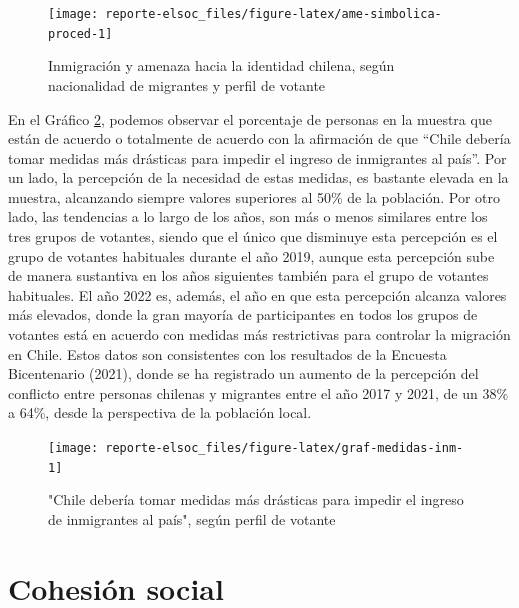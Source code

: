 \documentclass[
  12pt,
]{book}
\begin{document}
\begin{figure}

{\centering \texttt{[image: reporte-elsoc\_files/figure-latex/ame-simbolica-proced-1]} 

}

\caption{Inmigración y amenaza hacia la identidad chilena, según nacionalidad de migrantes y perfil de votante}\label{fig:ame-simbolica-proced}
\end{figure}

En el Gráfico \ref{fig:graf-medidas-inm}, podemos observar el porcentaje de personas en la muestra que están de acuerdo o totalmente de acuerdo con la afirmación de que ``Chile debería tomar medidas más drásticas para impedir el ingreso de inmigrantes al país''. Por un lado, la percepción de la necesidad de estas medidas, es bastante elevada en la muestra, alcanzando siempre valores superiores al 50\% de la población. Por otro lado, las tendencias a lo largo de los años, son más o menos similares entre los tres grupos de votantes, siendo que el único que disminuye esta percepción es el grupo de votantes habituales durante el año 2019, aunque esta percepción sube de manera sustantiva en los años siguientes también para el grupo de votantes habituales. El año 2022 es, además, el año en que esta percepción alcanza valores más elevados, donde la gran mayoría de participantes en todos los grupos de votantes está en acuerdo con medidas más restrictivas para controlar la migración en Chile. Estos datos son consistentes con los resultados de la Encuesta Bicentenario (2021), donde se ha registrado un aumento de la percepción del conflicto entre personas chilenas y migrantes entre el año 2017 y 2021, de un 38\% a 64\%, desde la perspectiva de la población local.

\begin{figure}

{\centering \texttt{[image: reporte-elsoc\_files/figure-latex/graf-medidas-inm-1]} 

}

\caption{"Chile debería tomar medidas más
drásticas para impedir el ingreso
de inmigrantes al país", según perfil de votante}\label{fig:graf-medidas-inm}
\end{figure}

\hypertarget{cohesiuxf3n-social}{%
\chapter{Cohesión social}\label{cohesiuxf3n-social}}
\end{document}
